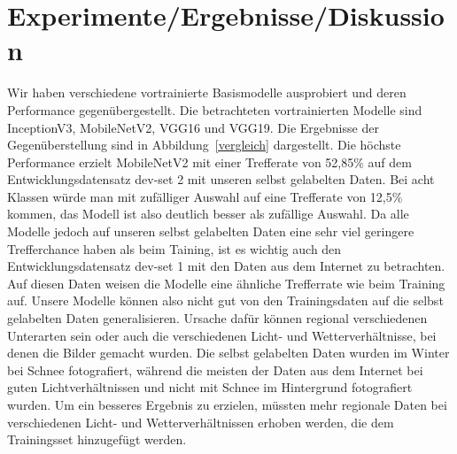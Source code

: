 \documentclass{article}
\begin{document}
\FloatBarrier

\section{Experimente/Ergebnisse/Diskussion}

Wir haben verschiedene vortrainierte Basismodelle ausprobiert und deren Performance gegenübergestellt. 
Die betrachteten vortrainierten Modelle sind InceptionV3, MobileNetV2, VGG16 und VGG19. 
Die Ergebnisse der Gegenüberstellung sind in Abbildung~\ref{vergleich} dargestellt. 
Die höchste Performance erzielt MobileNetV2 mit einer Trefferate von 52,85\% auf dem Entwicklungsdatensatz dev-set 2 mit unseren selbst gelabelten Daten. 
Bei acht Klassen würde man mit zufälliger Auswahl auf eine Trefferate von 12,5\% kommen, 
das Modell ist also deutlich besser als zufällige Auswahl. 
Da alle Modelle jedoch auf unseren selbst gelabelten Daten eine sehr viel geringere Trefferchance haben als beim Taining,
ist es wichtig auch den Entwicklungsdatensatz dev-set 1 mit den Daten aus dem Internet zu betrachten.
Auf diesen Daten weisen die Modelle eine ähnliche Trefferrate wie beim Training auf. 
Unsere Modelle können also nicht gut von den Trainingsdaten auf die selbst gelabelten Daten generalisieren. 
Ursache dafür können regional verschiedenen Unterarten sein 
oder auch die verschiedenen Licht- und Wetterverhältnisse, bei denen die Bilder gemacht wurden.
Die selbst gelabelten Daten wurden im Winter bei Schnee fotografiert, 
während die meisten der Daten aus dem Internet bei guten Lichtverhältnissen
und nicht mit Schnee im Hintergrund fotografiert wurden.
Um ein besseres Ergebnis zu erzielen, 
müssten mehr regionale Daten bei verschiedenen 
Licht- und Wetterverhältnissen erhoben werden, 
die dem Trainingsset hinzugefügt werden.
\end{document}
